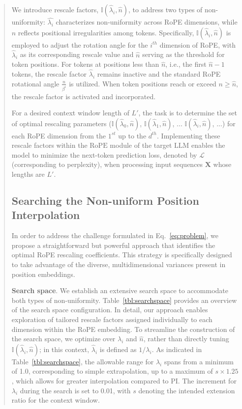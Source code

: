 \begin{abstract}
We introduce rescale factors, $\mathbb{I}(\hat{\lambda}_{i},\hat{n})$, to address two types of non-uniformity: $\hat{\lambda_i}$ characterizes non-uniformity across RoPE dimensions, while $\hat{n}$ reflects positional irregularities among tokens. Specifically, $\mathbb{I}(\hat{\lambda}_{i},\hat{n})$ is employed to adjust the rotation angle for the $i^{th}$ dimension of RoPE, with $\hat\lambda_{i}$ as its corresponding rescale value and $\hat{n}$ serving as the threshold for token positions. For tokens at positions less than $\hat{n}$, i.e., the first $\hat{n}-1$ tokens, the rescale factor $\hat\lambda_{i}$ remains inactive and the standard RoPE rotational angle $\frac{n}{\beta^i}$ is utilized. When token positions reach or exceed $n\ge\hat{n}$, the rescale factor is activated and incorporated.

For a desired context window length of $L'$, the task is to determine the set of optimal rescaling parameters ($\mathbb{I}(\hat{\lambda}_{0},\hat{n})$, $\mathbb{I}(\hat{\lambda}_{1},\hat{n})$, ... $\mathbb{I}(\hat{\lambda}_{i},\hat{n})$, ...) for each RoPE dimension from the $1^{st}$ up to the $d^{th}$. Implementing these rescale factors within the $\text{RoPE}$ module of the target $\text{LLM}$ enables the model to minimize the next-token prediction loss, denoted by $\mathcal{L}$ (corresponding to perplexity), when processing input sequences $\mathbf{X}$ whose lengths are $L'$.

\subsection{Searching the Non-uniform Position Interpolation}

In order to address the challenge formulated in Eq.~\ref{eq:problem}, we propose a straightforward but powerful approach that identifies the optimal RoPE rescaling coefficients. This strategy is specifically designed to take advantage of the diverse, multidimensional variances present in position embeddings.

\textbf{Search space}. We establish an extensive search space to accommodate both types of non-uniformity. Table~\ref{tbl:searchspace} provides an overview of the search space configuration. In detail, our approach enables exploration of tailored rescale factors assigned individually to each dimension within the RoPE embedding. To streamline the construction of the search space, we optimize over $\lambda_i$ and $\hat{n}$, rather than directly tuning $\mathbb{I}(\hat{\lambda}_{i},\hat{n})$; in this context, $\hat{\lambda}_{i}$ is defined as $1/\lambda_i$. As indicated in Table~\ref{tbl:searchspace}, the allowable range for $\lambda_i$ spans from a minimum of 1.0, corresponding to simple extrapolation, up to a maximum of $s\times1.25$, which allows for greater interpolation compared to PI. The increment for $\lambda_i$ during the search is set to 0.01, with $s$ denoting the intended extension ratio for the context window.


\end{abstract}
